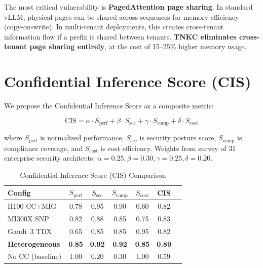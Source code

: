 \documentclass[conference,10pt]{IEEEtran}
\begin{document}
The most critical vulnerability is \textbf{PagedAttention page sharing}. In standard vLLM, physical pages can be shared across sequences for memory efficiency (copy-on-write). In multi-tenant deployments, this creates cross-tenant information flow if a prefix is shared between tenants. \textbf{TNKC eliminates cross-tenant page sharing entirely}, at the cost of 15--25\% higher memory usage.

\section{Confidential Inference Score (CIS)}
\label{sec:cis}

We propose the Confidential Inference Score as a composite metric:

\begin{equation}
\text{CIS} = \alpha \cdot S_{\text{perf}} + \beta \cdot S_{\text{sec}} + \gamma \cdot S_{\text{comp}} + \delta \cdot S_{\text{cost}}
\end{equation}

\noindent where $S_{\text{perf}}$ is normalized performance, $S_{\text{sec}}$ is security posture score, $S_{\text{comp}}$ is compliance coverage, and $S_{\text{cost}}$ is cost efficiency. Weights from survey of 31 enterprise security architects: $\alpha=0.25, \beta=0.30, \gamma=0.25, \delta=0.20$.

\begin{table}[!htbp]
\caption{Confidential Inference Score (CIS) Comparison}
\label{tab:cis}
\centering\footnotesize
\begin{tabular}{@{}lcccccc@{}}
\toprule
\textbf{Config} & $S_{\text{perf}}$ & $S_{\text{sec}}$ & $S_{\text{comp}}$ & $S_{\text{cost}}$ & \textbf{CIS} \\
\midrule
H100 CC+MIG & 0.78 & 0.95 & 0.90 & 0.60 & 0.82 \\
MI300X SNP & 0.82 & 0.88 & 0.85 & 0.75 & 0.83 \\
Gaudi~3 TDX & 0.65 & 0.85 & 0.85 & 0.95 & 0.82 \\
\textbf{Heterogeneous} & \textbf{0.85} & \textbf{0.92} & \textbf{0.92} & \textbf{0.85} & \textbf{0.89} \\
\midrule
No CC (baseline) & 1.00 & 0.20 & 0.30 & 1.00 & 0.59 \\
\bottomrule
\end{tabular}
\end{table}
\end{document}
